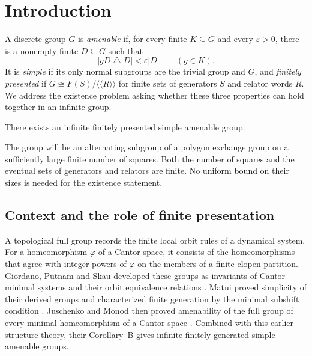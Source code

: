\section{Introduction}\label{sec:introduction}

A discrete group $G$ is \emph{amenable} if, for every finite
$K\subseteq G$ and every $\varepsilon>0$, there is a nonempty finite
$D\subseteq G$ such that
\begin{equation}\label{eq:folner-introduction}
 |gD\mathbin{\triangle}D|<\varepsilon |D|
 \qquad(g\in K).
\end{equation}
It is \emph{simple} if its only normal subgroups are the trivial
group and $G$, and \emph{finitely presented} if
$G\cong F(S)/\langle\!\langle R\rangle\!\rangle$ for finite sets
of generators $S$ and relator words $R$. We address the existence
problem asking whether these three properties can hold together
in an infinite group.

\begin{theorem}\label{thm:main}
There exists an infinite finitely presented simple amenable group.
\end{theorem}

The group will be an alternating subgroup of a polygon exchange
group on a sufficiently large finite number of squares. Both the
number of squares and the eventual sets of generators and relators
are finite. No uniform bound on their sizes is needed for the
existence statement.

\subsection{Context and the role of finite presentation}

A topological full group records the finite local orbit rules of a
dynamical system.  For a homeomorphism $\varphi$ of a Cantor space,
it consists of the homeomorphisms that agree with integer powers of
$\varphi$ on the members of a finite clopen partition.  Giordano,
Putnam and Skau developed these groups as invariants of Cantor
minimal systems and their orbit equivalence relations
\cite{GiordanoPutnamSkau1999}.  Matui proved simplicity of their
derived groups and characterized finite generation by the minimal
subshift condition \cite[Theorems~4.9 and~5.4]{Matui2006}.
Juschenko and Monod then proved amenability of the full group of
every minimal homeomorphism of a Cantor space
\cite[Theorem~A]{JuschenkoMonod2013}.  Combined with this earlier
structure theory, their Corollary~B gives infinite finitely generated
simple amenable groups.

